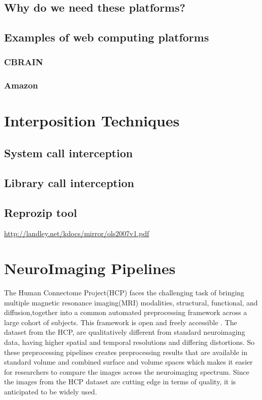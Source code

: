 \subsection{Why do we need these platforms?}
\subsection{Examples of web computing platforms}
\subsubsection{CBRAIN}
\subsubsection{Amazon}

\section{Interposition Techniques}
\subsection{System call interception}
\subsection{Library call interception}
\subsection{Reprozip tool}
\hyperref[System Call Interception]{http://landley.net/kdocs/mirror/ols2007v1.pdf}

\section{NeuroImaging Pipelines}
The Human Connectome Project(HCP) faces the challenging task of bringing multiple magnetic resonance imaging(MRI) modalities, structural, functional, and diffusion,together into a common automated preprocessing framework across a large cohort of subjects. This framework is open and freely accessible \cite{Gla13}. The dataset from the HCP, are qualitatively different from standard neuroimaging data, having higher spatial and temporal resolutions and differing distortions. So these preprocessing pipelines creates preprocessing results that are available in standard volume and combined surface and volume spaces which makes it easier for researchers to compare the images across the neuroimaging spectrum. Since the images from the HCP dataset are cutting edge in terms of quality, it is anticipated to be widely used.

